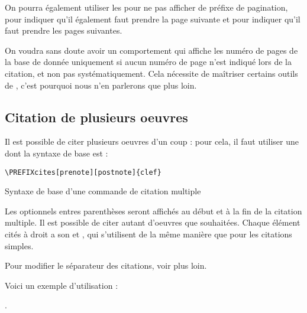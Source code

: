 On pourra également utiliser les   pour ne pas afficher de préfixe de pagination,   pour indiquer qu'il également faut prendre la page suivante et  pour indiquer qu'il faut prendre les pages suivantes.

\begin{anedocte}
On voudra sans doute avoir un comportement qui affiche les numéro de pages de la base de donnée uniquement si aucun numéro de page n'est indiqué lors de la citation, et non pas systématiquement. Cela nécessite de maîtriser certains outils de , c'est pourquoi nous n'en parlerons que plus loin.
\end{anedocte}

\subsection{Citation de plusieurs oeuvres}

Il est possible de citer plusieurs oeuvres d'un coup : pour cela, il faut utiliser une  dont la syntaxe de base est :

\begin{listing}[ht]
\begin{verbatim}
\PREFIXcites[prenote][postnote]{clef}
\end{verbatim}
\caption{Syntaxe de base d'une commande de citation multiple}
\end{listing}
Les  optionnels entres parenthèses seront affichés au début et à la fin de la citation multiple. Il est possible de citer autant d'oeuvres que souhaitées. Chaque élément cités à droit a son   et , qui s'utilisent de la même manière que pour les citations simples.

\begin{anedocte}
Pour modifier le séparateur des citations, voir plus loin.
\end{anedocte}

Voici un exemple d'utilisation : 

.

